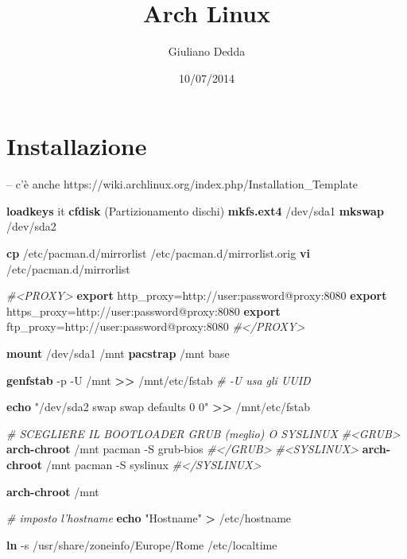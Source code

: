 \documentclass[]{article}
\title{Arch Linux}
\author{Giuliano Dedda}
\date{10/07/2014}
\newenvironment{Shaded}{}{}
\newcommand{\KeywordTok}[1]{\textcolor[rgb]{0.00,0.44,0.13}{\textbf{{#1}}}}
\newcommand{\StringTok}[1]{\textcolor[rgb]{0.25,0.44,0.63}{{#1}}}
\newcommand{\CommentTok}[1]{\textcolor[rgb]{0.38,0.63,0.69}{\textit{{#1}}}}
\newcommand{\OtherTok}[1]{\textcolor[rgb]{0.00,0.44,0.13}{{#1}}}
\newcommand{\NormalTok}[1]{{#1}}
\begin{document}
\maketitle

\section{Installazione}\label{installazione}

-- c'è anche https://wiki.archlinux.org/index.php/Installation\_Template

\begin{Shaded}
\begin{Highlighting}[]
\KeywordTok{loadkeys} \NormalTok{it}
\KeywordTok{cfdisk}    \NormalTok{(Partizionamento dischi)}
\KeywordTok{mkfs.ext4} \NormalTok{/dev/sda1}
\KeywordTok{mkswap} \NormalTok{/dev/sda2}

\KeywordTok{cp} \NormalTok{/etc/pacman.d/mirrorlist /etc/pacman.d/mirrorlist.orig}
\KeywordTok{vi} \NormalTok{/etc/pacman.d/mirrorlist}

\CommentTok{#<PROXY>}
\KeywordTok{export} \OtherTok{http_proxy=}\NormalTok{http://user:password@}\OtherTok{proxy}\NormalTok{:8080}
\KeywordTok{export} \OtherTok{https_proxy=}\NormalTok{http://user:password@}\OtherTok{proxy}\NormalTok{:8080}
\KeywordTok{export} \OtherTok{ftp_proxy=}\NormalTok{http://user:password@}\OtherTok{proxy}\NormalTok{:8080}
\CommentTok{#</PROXY>}

\KeywordTok{mount} \NormalTok{/dev/sda1 /mnt}
\KeywordTok{pacstrap} \NormalTok{/mnt base }


\KeywordTok{genfstab} \NormalTok{-p -U /mnt }\KeywordTok{>>} \NormalTok{/mnt/etc/fstab }
        \CommentTok{# -U usa gli UUID}

\KeywordTok{echo} \StringTok{"/dev/sda2 swap    swap    defaults    0   0"} \KeywordTok{>>} \NormalTok{/mnt/etc/fstab}

\CommentTok{# SCEGLIERE IL BOOTLOADER GRUB (meglio) O SYSLINUX}
\CommentTok{#<GRUB>}
\KeywordTok{arch-chroot} \NormalTok{/mnt pacman -S grub-bios}
\CommentTok{#</GRUB>}
\CommentTok{#<SYSLINUX>}
\KeywordTok{arch-chroot} \NormalTok{/mnt pacman -S syslinux}
\CommentTok{#</SYSLINUX>}

\KeywordTok{arch-chroot} \NormalTok{/mnt}

\CommentTok{# imposto l’hostname}
\KeywordTok{echo} \StringTok{"Hostname"} \KeywordTok{>} \NormalTok{/etc/hostname}

\KeywordTok{ln} \NormalTok{-s /usr/share/zoneinfo/Europe/Rome /etc/localtime}


\end{Highlighting}
\end{Shaded}
\end{document}
